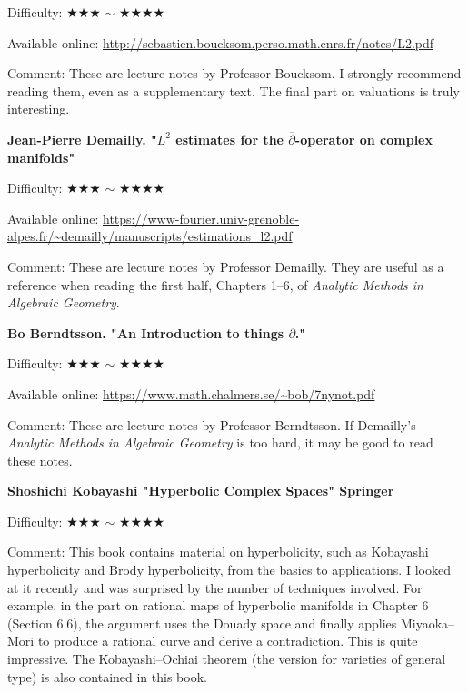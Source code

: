 Difficulty: ★★★ $\sim$ ★★★★  　\vspace{-6pt} 

Available online: \url{http://sebastien.boucksom.perso.math.cnrs.fr/notes/L2.pdf}\vspace{-6pt}

Comment: These are lecture notes by Professor Boucksom. I strongly recommend reading them, even as a supplementary text. The final part on valuations is truly interesting.
\vspace{8pt}

\textbf{Jean-Pierre Demailly. "$L^2$ estimates for the $\overline{\partial}$-operator on complex manifolds"}  　\vspace{-6pt} 

Difficulty: ★★★ $\sim$ ★★★★  　\vspace{-6pt} 

Available online: \url{https://www-fourier.univ-grenoble-alpes.fr/~demailly/manuscripts/estimations_l2.pdf}\vspace{-6pt}

Comment: These are lecture notes by Professor Demailly. They are useful as a reference when reading the first half, Chapters 1--6, of \emph{Analytic Methods in Algebraic Geometry}.
\vspace{8pt}

\textbf{Bo Berndtsson. "An Introduction to things $\bar\partial$."}  　\vspace{-6pt} 

Difficulty: ★★★ $\sim$ ★★★★  　\vspace{-6pt} 

Available online: \url{https://www.math.chalmers.se/~bob/7nynot.pdf}\vspace{-6pt}

Comment: These are lecture notes by Professor Berndtsson. If Demailly's \emph{Analytic Methods in Algebraic Geometry} is too hard, it may be good to read these notes. 
\vspace{8pt}

\textbf{Shoshichi Kobayashi "Hyperbolic Complex Spaces" Springer}  　\vspace{-6pt} 

Difficulty: ★★★ $\sim$ ★★★★  　\vspace{-6pt} 

Comment: This book contains material on hyperbolicity, such as Kobayashi hyperbolicity and Brody hyperbolicity, from the basics to applications. I looked at it recently and was surprised by the number of techniques involved. For example, in the part on rational maps of hyperbolic manifolds in Chapter 6 (Section 6.6), the argument uses the Douady space and finally applies Miyaoka--Mori to produce a rational curve and derive a contradiction. This is quite impressive. The Kobayashi--Ochiai theorem (the version for varieties of general type) is also contained in this book.
\vspace{8pt}

